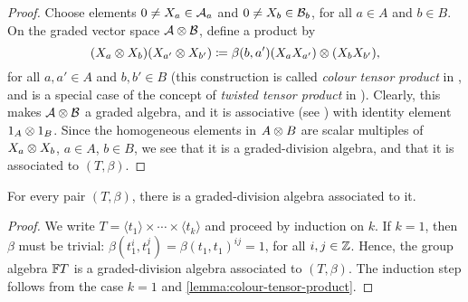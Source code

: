 \begin{proof}
    Choose elements $0 \neq X_a \in \mathcal A_a$ and $0 \neq X_b \in \mathcal B_b$, for all $a\in A$ and $b\in B$. 
    On the graded vector space $\mathcal A \otimes \mathcal B$, define a product by \[(X_a \otimes X_b) (X_{a'} \otimes X_{b'}) \coloneqq \beta(b, a') (X_{a} X_{a'}) \otimes (X_{b}X_{b'}),\] for all $a,a' \in A$ and $b, b' \in B$ (this construction is called \emph{colour tensor product} in \cite[page 88]{MR1192546}, and is a special case of the concept of \emph{twisted tensor product} in \cite{twisted-tensor}). 
    Clearly, this makes $\mathcal A \otimes \mathcal B$ a graded algebra, and it is associative (see \cite{MR1192546}) %
    with identity element $1_A \otimes 1_B$. Since the homogeneous elements in $A\otimes B$ are scalar multiples of $X_a \otimes X_b$, $a\in A$, $b\in B$, we see that it is a graded-division algebra, and that it is associated to $(T, \beta)$. 
\end{proof}

\begin{prop}
    For every pair $(T, \beta)$, there is a graded-division algebra associated to it. 
\end{prop}

\begin{proof}
    We write $T = \langle t_1 \rangle \times \cdots \times \langle t_k \rangle$ and proceed by induction on $k$. 
    If $k = 1$, then $\beta$ must be trivial: $\beta(t_1^i,t_1^j) = \beta(t_1, t_1)^{ij} = 1$, for all $i, j \in \mathbb{Z}$. 
    Hence, the group algebra $\mathbb{F} T$ is a graded-division algebra associated to $(T, \beta)$. 
    The induction step follows from the case $k=1$ and \cref{lemma:colour-tensor-product}.
\end{proof}

